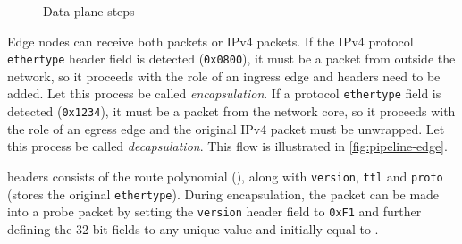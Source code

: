\begin{figure}[ht]
\begin{minipage}{0.49\linewidth}
    \caption{Edge ingress/egress steps}
    \label{fig:pipeline-edge}
    \end{minipage}
    \begin{minipage}{0.49\linewidth}
    \centering    
    \caption{Data plane steps }
    \label{fig:pipeline-core}
    \end{minipage}
\end{figure}

Edge nodes can receive both \polka packets or IPv4 packets. If the IPv4 protocol \texttt{ethertype} header field is detected (\texttt{0x0800}), it must be a packet from outside the network, so it proceeds with the role of an ingress edge and \polka headers need to be added. Let this process be called \textit{encapsulation}. If a \polka protocol \texttt{ethertype} field is detected (\texttt{0x1234}), it must be a packet from the network core, so it proceeds with the role of an egress edge and the original IPv4 packet must be unwrapped. Let this process be called \textit{decapsulation}. This flow is illustrated in \autoref{fig:pipeline-edge}.

\polka headers consists of the route polynomial (\routeid), along with \texttt{version}, \texttt{ttl} and \texttt{proto} (stores the original \texttt{ethertype}).
During encapsulation, the packet can be made into a probe packet by setting the \texttt{version} header field to \texttt{0xF1} and further defining the 32-bit fields \timestamp to any unique value and \lhash initially equal to \timestamp.

